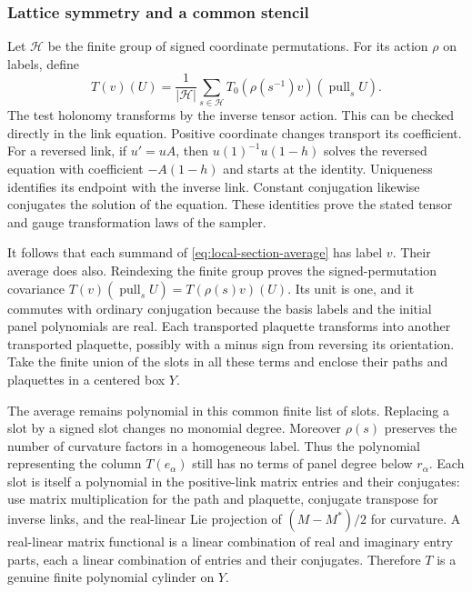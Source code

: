 \subsubsection{Lattice symmetry and a common stencil}
Let $\mathcal H$ be the finite group of signed coordinate
permutations. For its action $\rho$ on labels, define
\begin{equation}\label{eq:local-section-average}
     T(v)(U)=\frac1{|\mathcal H|}\sum_{s\in\mathcal H}
                       T_0(\rho(s^{-1})v)(\operatorname{pull}_sU).
\end{equation}
The test holonomy transforms by the inverse tensor action.
This can be checked directly in the link equation. Positive
coordinate changes transport its coefficient. For a reversed link,
if $u'=uA$, then $u(1)^{-1}u(1-h)$ solves the reversed equation
with coefficient $-A(1-h)$ and starts at the identity. Uniqueness
identifies its endpoint with the inverse link. Constant conjugation
likewise conjugates the solution of the equation. These identities
prove the stated tensor and gauge transformation laws of the sampler.

It follows that each summand of \eqref{eq:local-section-average}
has label $v$. Their average does also. Reindexing the finite group
proves the signed-permutation covariance
$T(v)(\operatorname{pull}_sU)=T(\rho(s)v)(U)$. Its unit
is one, and it commutes with ordinary conjugation because the basis
labels and the initial panel polynomials are real. Each transported
plaquette transforms into another transported plaquette, possibly
with a minus sign from reversing its orientation. Take the finite
union of the slots in all these terms and enclose their paths and
plaquettes in a centered box $Y$.

The average remains polynomial in this common finite list of slots.
Replacing a slot by a signed slot changes no monomial degree.
Moreover $\rho(s)$ preserves the number of curvature factors in
a homogeneous label. Thus the polynomial representing the column
$T(e_\alpha)$ still has no terms of panel degree below $r_\alpha$.
Each slot is itself a polynomial in the positive-link matrix entries
and their conjugates: use matrix multiplication for the path and
plaquette, conjugate transpose for inverse links, and the real-linear
Lie projection of $(M-M^*)/2$ for curvature. A real-linear matrix
functional is a linear combination of real and imaginary entry
parts, each a linear combination of entries and their conjugates.
Therefore $T$ is a genuine finite polynomial cylinder on $Y$.

